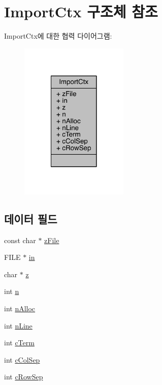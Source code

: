 \hypertarget{struct_import_ctx}{}\section{Import\+Ctx 구조체 참조}
\label{struct_import_ctx}


Import\+Ctx에 대한 협력 다이어그램\+:
\nopagebreak
\begin{figure}[H]
\begin{center}
\leavevmode
\includegraphics[width=146pt]{d5/dd0/struct_import_ctx__coll__graph}
\end{center}
\end{figure}
\subsection*{데이터 필드}
\begin{DoxyCompactItemize}
\item 
const char $\ast$ \hyperlink{struct_import_ctx_a88414dab6838f62acc8dbb3d2afe299d}{z\+File}
\item 
F\+I\+LE $\ast$ \hyperlink{struct_import_ctx_a63c21cba47680ddd0c842866ab5486e5}{in}
\item 
char $\ast$ \hyperlink{struct_import_ctx_ade5d138b0f146f8bed3e83bfbb450f2e}{z}
\item 
int \hyperlink{struct_import_ctx_a93c89715a8ced4d28b9dcb29a083f748}{n}
\item 
int \hyperlink{struct_import_ctx_a04606938856e8071c34af5c68607734b}{n\+Alloc}
\item 
int \hyperlink{struct_import_ctx_a7b910b2b078d291e84ad333792efb000}{n\+Line}
\item 
int \hyperlink{struct_import_ctx_a32c66d4ff064ed9d5775ec6a0bab66ba}{c\+Term}
\item 
int \hyperlink{struct_import_ctx_a5c5dc07e3bd063d2da26da4a83f46576}{c\+Col\+Sep}
\item 
int \hyperlink{struct_import_ctx_a9b23999b41777a9726b91ec61b74f21a}{c\+Row\+Sep}
\end{DoxyCompactItemize}


